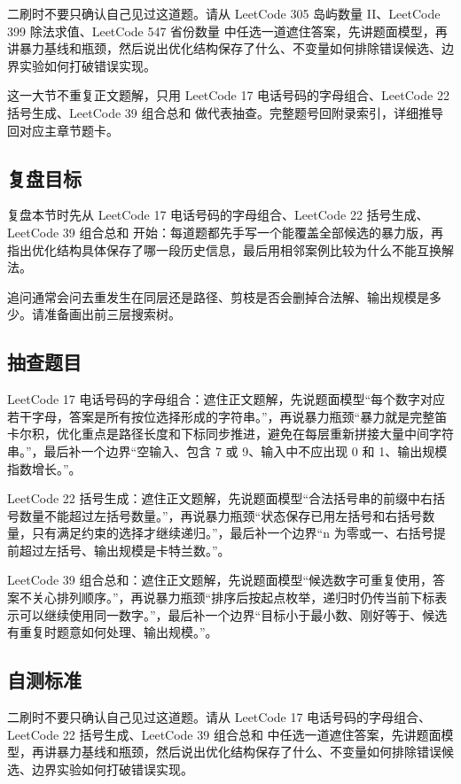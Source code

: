 二刷时不要只确认自己见过这道题。请从 LeetCode 305 岛屿数量 II、LeetCode 399 除法求值、LeetCode 547 省份数量 中任选一道遮住答案，先讲题面模型，再讲暴力基线和瓶颈，然后说出优化结构保存了什么、不变量如何排除错误候选、边界实验如何打破错误实现。

这一大节不重复正文题解，只用 LeetCode 17 电话号码的字母组合、LeetCode 22 括号生成、LeetCode 39 组合总和 做代表抽查。完整题号回附录索引，详细推导回对应主章节题卡。

\subsection{复盘目标}

复盘本节时先从 LeetCode 17 电话号码的字母组合、LeetCode 22 括号生成、LeetCode 39 组合总和 开始：每道题都先手写一个能覆盖全部候选的暴力版，再指出优化结构具体保存了哪一段历史信息，最后用相邻案例比较为什么不能互换解法。

追问通常会问去重发生在同层还是路径、剪枝是否会删掉合法解、输出规模是多少。请准备画出前三层搜索树。

\subsection{抽查题目}

LeetCode 17 电话号码的字母组合：遮住正文题解，先说题面模型“每个数字对应若干字母，答案是所有按位选择形成的字符串。”，再说暴力瓶颈“暴力就是完整笛卡尔积，优化重点是路径长度和下标同步推进，避免在每层重新拼接大量中间字符串。”，最后补一个边界“空输入、包含 7 或 9、输入中不应出现 0 和 1、输出规模指数增长。”。

LeetCode 22 括号生成：遮住正文题解，先说题面模型“合法括号串的前缀中右括号数量不能超过左括号数量。”，再说暴力瓶颈“状态保存已用左括号和右括号数量，只有满足约束的选择才继续递归。”，最后补一个边界“n 为零或一、右括号提前超过左括号、输出规模是卡特兰数。”。

LeetCode 39 组合总和：遮住正文题解，先说题面模型“候选数字可重复使用，答案不关心排列顺序。”，再说暴力瓶颈“排序后按起点枚举，递归时仍传当前下标表示可以继续使用同一数字。”，最后补一个边界“目标小于最小数、刚好等于、候选有重复时题意如何处理、输出规模。”。

\subsection{自测标准}

二刷时不要只确认自己见过这道题。请从 LeetCode 17 电话号码的字母组合、LeetCode 22 括号生成、LeetCode 39 组合总和 中任选一道遮住答案，先讲题面模型，再讲暴力基线和瓶颈，然后说出优化结构保存了什么、不变量如何排除错误候选、边界实验如何打破错误实现。

